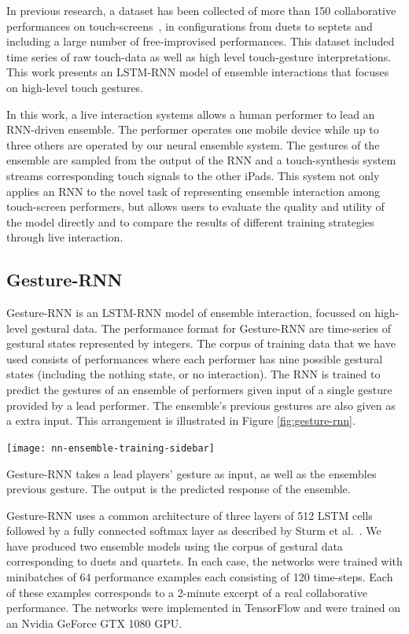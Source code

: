 \documentclass[sigchi-a, authorversion]{acmart}
\begin{document}
In previous research, a dataset has been collected of more than 150
collaborative performances on touch-screens~\cite{Martin:2016rm}, in
configurations from duets to septets and including a large number of
free-improvised performances. This dataset included time series of raw
touch-data as well as high level touch-gesture interpretations. This
work presents an LSTM-RNN model of ensemble interactions that focuses
on high-level touch gestures.

In this work, a live interaction systems allows a human performer to
lead an RNN-driven ensemble. The performer operates one mobile device
while up to three others are operated by our neural ensemble system.
The gestures of the ensemble are sampled from the output of the RNN
and a touch-synthesis system streams corresponding touch signals to
the other iPads. This system not only applies an RNN to the novel task
of representing ensemble interaction among touch-screen performers,
but allows users to evaluate the quality and utility of the model
directly and to compare the results of different training strategies
through live interaction.

\subsection{Gesture-RNN}

Gesture-RNN is an LSTM-RNN model of ensemble interaction, focussed on
high-level gestural data. The performance format for Gesture-RNN are
time-series of gestural states represented by integers. The corpus of
training data that we have used consists of performances where each
performer has nine possible gestural states (including the nothing
state, or no interaction). The RNN is trained to predict the gestures
of an ensemble of performers given input of a single gesture provided
by a lead performer. The ensemble's previous gestures are also given
as a extra input. This arrangement is illustrated in Figure
\ref{fig:gesture-rnn}.

\begin{marginfigure}
    \texttt{[image: nn-ensemble-training-sidebar]}
    \caption{Gesture-RNN takes a lead players' gesture as input, as
      well as the ensembles previous gesture. The output is the
      predicted response of the ensemble.}
    \label{fig:gesture-rnn}
\end{marginfigure}

Gesture-RNN uses a common architecture of three layers of 512 LSTM
cells followed by a fully connected softmax layer as described by
Sturm et al.~\cite{Sturm:2016rz}. We have produced two ensemble models
using the corpus of gestural data corresponding to duets and quartets.
In each case, the networks were trained with minibatches of 64
performance examples each consisting of 120 time-steps. Each of these
examples corresponds to a 2-minute excerpt of a real collaborative
performance. The networks were implemented in TensorFlow and were
trained on an Nvidia GeForce GTX 1080 GPU.
\end{document}
